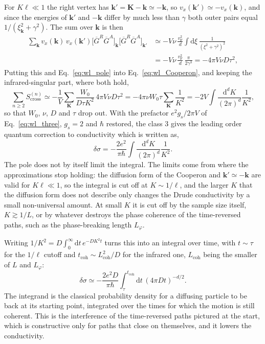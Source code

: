 For $K\ell\ll1$ the right vertex has $\mathbf k'=\mathbf K-\mathbf k\simeq-\mathbf k$, so $v_x(\mathbf k')\simeq-v_x(\mathbf k)$, and since the energies of $\mathbf k'$ and $-\mathbf k$ differ by much less than $\gamma$ both outer pairs equal $1/(\xi_{\mathbf k}^2+\gamma^2)$. The sum over $\mathbf k$ is then
\[
\begin{split}
\sum_{\mathbf k}v_x(\mathbf k)\,v_x(\mathbf k')\big[\overline G^R\overline G^A\big]_{\mathbf k}\big[\overline G^R\overline G^A\big]_{\mathbf k'}
&\simeq-V\nu\,\frac{v_{\mathrm F}^2}{d}\int\mathrm{d}\xi\,\frac{1}{(\xi^2+\gamma^2)^2}\\
&=-V\nu\,\frac{v_{\mathrm F}^2}{d}\,\frac{\pi}{2\gamma^3}=-4\pi V\nu D\tau^2 ,
\end{split}
\]
Putting this and Eq.~\eqref{eq:wl_pole} into Eq.~\eqref{eq:wl_Cooperon}, and keeping the infrared-singular part, where both hold,
\[
\sum_{n\ge2}S^{(n)}_{\mathrm{cross}}\simeq-\frac1V\sum_{\mathbf K}\frac{W_0}{D\tau K^2}\,4\pi V\nu D\tau^2
=-4\pi\nu W_0\tau\sum_{\mathbf K}\frac1{K^2}=-2V\int\frac{\mathrm{d}^dK}{(2\pi)^d}\frac1{K^2},
\]
so that $W_0$, $\nu$, $D$ and $\tau$ drop out. With the prefactor $e^2g_s/2\pi V$ of Eq.~\eqref{eq:wl_three}, $g_s=2$ and $\hbar$ restored, the class 3 gives the leading order quantum correction to conductivity which is written as,
\begin{equation}
    \delta\sigma=-\frac{2e^2}{\pi\hbar}\int\frac{\mathrm{d}^dK}{(2\pi)^d}\frac{1}{K^2}.
    \label{eq:wl_deltasigma}
\end{equation}
The pole does not by itself limit the integral. The limits come from where the approximations stop holding: the diffusion form of the Cooperon and $\mathbf k'\simeq-\mathbf k$ are valid for $K\ell\ll1$, so the integral is cut off at $K\sim1/\ell$, and the larger $K$ that the diffusion form does not describe only changes the Drude conductivity by a small non-universal amount. At small $K$ it is cut off by the sample size itself, $K\gtrsim1/L$, or by whatever destroys the phase coherence of the time-reversed paths, such as the phase-breaking length $L_\varphi$.

Writing $1/K^2=D\int_0^\infty\mathrm{d}t\,e^{-DK^2t}$ turns this into an integral over time, with $t\sim\tau$ for the $1/\ell$ cutoff and $t_{\mathrm{coh}}\sim L_{\mathrm{coh}}^2/D$ for the infrared one, $L_{\mathrm{coh}}$ being the smaller of $L$ and $L_\varphi$:
\[
\delta\sigma\simeq-\frac{2e^2D}{\pi\hbar}\int_{\tau}^{t_{\mathrm{coh}}}\mathrm{d}t\,(4\pi Dt)^{-d/2} .
\]
The integrand is the classical probability density for a diffusing particle to be back at its starting point, integrated over the times for which the motion is still coherent. This is the interference of the time-reversed paths pictured at the start, which is constructive only for paths that close on themselves, and it lowers the conductivity.
